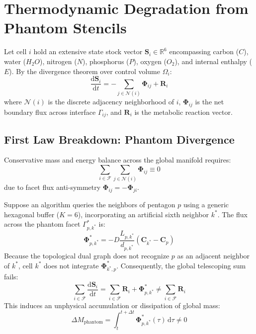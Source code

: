 \documentclass[10pt,twocolumn,letterpaper]{article}
\theoremstyle{definition}
\begin{document}
\section{Thermodynamic Degradation from Phantom Stencils}

Let cell $i$ hold an extensive state stock vector $\mathbf{S}_i \in \mathbb{R}^6$ encompassing carbon ($C$), water ($H_2O$), nitrogen ($N$), phosphorus ($P$), oxygen ($O_2$), and internal enthalpy ($E$). By the divergence theorem over control volume $\Omega_i$:
\begin{equation}
\frac{\mathrm{d}\mathbf{S}_i}{\mathrm{d}t} = -\sum_{j \in \mathcal{N}(i)} \mathbf{\Phi}_{ij} + \mathbf{R}_i
\end{equation}
where $\mathcal{N}(i)$ is the discrete adjacency neighborhood of $i$, $\mathbf{\Phi}_{ij}$ is the net boundary flux across interface $\Gamma_{ij}$, and $\mathbf{R}_i$ is the metabolic reaction vector.

\subsection{First Law Breakdown: Phantom Divergence}
Conservative mass and energy balance across the global manifold requires:
\begin{equation}
\sum_{i \in \mathcal{F}} \sum_{j \in \mathcal{N}(i)} \mathbf{\Phi}_{ij} \equiv 0
\end{equation}
due to facet flux anti-symmetry $\mathbf{\Phi}_{ij} = -\mathbf{\Phi}_{ji}$.

Suppose an algorithm queries the neighbors of pentagon $p$ using a generic hexagonal buffer ($K = 6$), incorporating an artificial sixth neighbor $k^*$. The flux across the phantom facet $\Gamma_{p, k^*}^*$ is:
\begin{equation}
\mathbf{\Phi}_{p, k^*}^* = -D \frac{L_{p, k^*}}{d_{p, k^*}}(\mathbf{C}_{k^*} - \mathbf{C}_p)
\end{equation}
Because the topological dual graph does not recognize $p$ as an adjacent neighbor of $k^*$, cell $k^*$ does not integrate $\mathbf{\Phi}_{k^*, p}^*$. Consequently, the global telescoping sum fails:
\begin{equation}
\sum_{i \in \mathcal{F}} \frac{\mathrm{d}\mathbf{S}_i}{\mathrm{d}t} = \sum_{i \in \mathcal{F}} \mathbf{R}_i + \mathbf{\Phi}_{p, k^*}^* \neq \sum_{i \in \mathcal{F}} \mathbf{R}_i
\end{equation}
This induces an unphysical accumulation or dissipation of global mass:
\begin{equation}
\Delta M_{\mathrm{phantom}} = \int_{t}^{t+\Delta t} \mathbf{\Phi}_{p, k^*}^*(\tau) \, \mathrm{d}\tau \neq 0
\end{equation}
\end{document}
